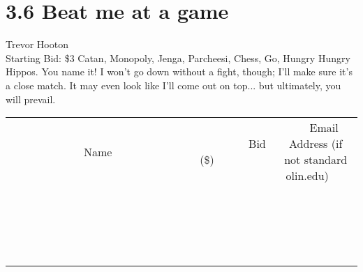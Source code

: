 \documentclass[11pt]{article}
\begin{document}
\section*{3.6 Beat me at a game}
Trevor Hooton
\\
Starting Bid: \$3
\newline
Catan, Monopoly, Jenga, Parcheesi, Chess, Go, Hungry Hungry Hippos. You name it! 
I won't go down without a fight, though; I'll make sure it's a close match. It may even look like I'll come out on top... but ultimately, you will prevail.
\\[3ex]
\begin{tabular}{c c c}
~~~~~~~~~~~~~Name~~~~~~~~~~~~~ & ~~~~~~~~~Bid (\$)~~~~~~~~~  & ~~~Email Address (if not standard olin.edu)~~~\\
 & & \\
\hline
 & & \\
\hline
 & & \\
\hline
 & & \\
\hline
 & & \\
\hline
 & & \\
\hline
 & & \\
\hline
 & & \\
\hline
 & & \\
\hline
 & & \\
\hline
 & & \\
\hline
 & & \\
\hline
 & & \\
\hline
 & & \\
\hline
 & & \\
\hline
 & & \\
\hline
 & & \\
\hline
 & & \\
\hline
 & & \\
\hline
\end{tabular}
\newpage
\end{document}
